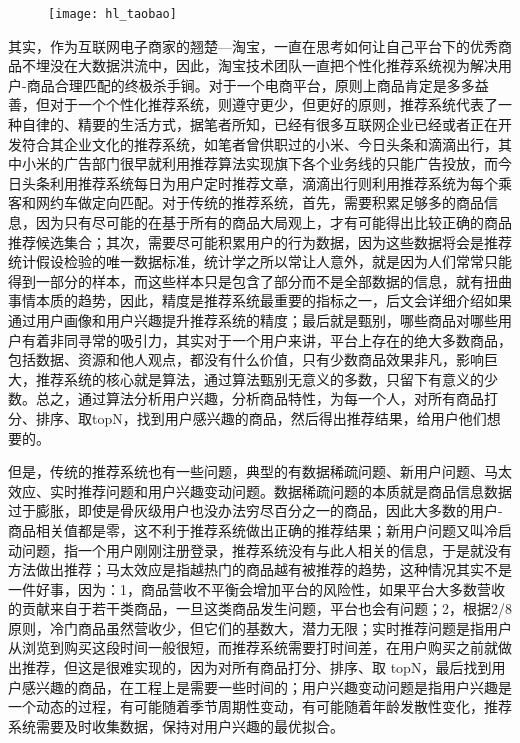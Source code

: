 	\begin{figure}
		\centering
		\texttt{[image: hl\_taobao]}
		\label{fig:hl_taobao}
	\end{figure}
	其实，作为互联网电子商家的翘楚---淘宝，一直在思考如何让自己平台下的优秀商品不埋没在大数据洪流中，因此，淘宝技术团队一直把个性化推荐系统视为解决用户-商品合理匹配的终极杀手锏。对于一个电商平台，原则上商品肯定是多多益善，但对于一个个性化推荐系统，则遵守更少，但更好的原则，推荐系统代表了一种自律的、精要的生活方式，据笔者所知，已经有很多互联网企业已经或者正在开发符合其企业文化的推荐系统，如笔者曾供职过的小米、今日头条和滴滴出行，其中小米的广告部门很早就利用推荐算法实现旗下各个业务线的只能广告投放，而今日头条利用推荐系统每日为用户定时推荐文章，滴滴出行则利用推荐系统为每个乘客和网约车做定向匹配。对于传统的推荐系统，首先，需要积累足够多的商品信息，因为只有尽可能的在基于所有的商品大局观上，才有可能得出比较正确的商品推荐候选集合；其次，需要尽可能积累用户的行为数据，因为这些数据将会是推荐统计假设检验的唯一数据标准，统计学之所以常让人意外，就是因为人们常常只能得到一部分的样本，而这些样本只是包含了部分而不是全部数据的信息，就有扭曲事情本质的趋势，因此，精度是推荐系统最重要的指标之一，后文会详细介绍如果通过用户画像和用户兴趣\citep{user-interests-explore,user-interests-explore1,user-interests-explore2,user-interests-explore3,user-interests-explore4}提升推荐系统的精度；最后就是甄别，哪些商品对哪些用户有着非同寻常的吸引力，其实对于一个用户来讲，平台上存在的绝大多数商品，包括数据、资源和他人观点，都没有什么价值，只有少数商品效果非凡，影响巨大，推荐系统的核心就是算法，通过算法甄别无意义的多数，只留下有意义的少数。总之，通过算法分析用户兴趣，分析商品特性，为每一个人，对所有商品打分、排序、取topN，找到用户感兴趣的商品，然后得出推荐结果，给用户他们想要的。

	但是，传统的推荐系统也有一些问题，典型的有数据稀疏问题、新用户问题、马太效应、实时推荐问题和用户兴趣变动问题。数据稀疏问题的本质就是商品信息数据过于膨胀，即使是骨灰级用户也没办法穷尽百分之一的商品，因此大多数的用户-商品相关值都是零，这不利于推荐系统做出正确的推荐结果；新用户问题又叫冷启动问题，指一个用户刚刚注册登录，推荐系统没有与此人相关的信息，于是就没有方法做出推荐；马太效应是指越热门的商品越有被推荐的趋势，这种情况其实不是一件好事，因为：1，商品营收不平衡会增加平台的风险性，如果平台大多数营收的贡献来自于若干类商品，一旦这类商品发生问题，平台也会有问题；2，根据2/8原则，冷门商品虽然营收少，但它们的基数大，潜力无限；实时推荐问题是指用户从浏览到购买这段时间一般很短，而推荐系统需要打时间差，在用户购买之前就做出推荐，但这是很难实现的，因为对所有商品打分、排序、取 topN，最后找到用户感兴趣的商品，在工程上是需要一些时间的；用户兴趣变动问题是指用户兴趣是一个动态的过程，有可能随着季节周期性变动，有可能随着年龄发散性变化，推荐系统需要及时收集数据，保持对用户兴趣的最优拟合。

